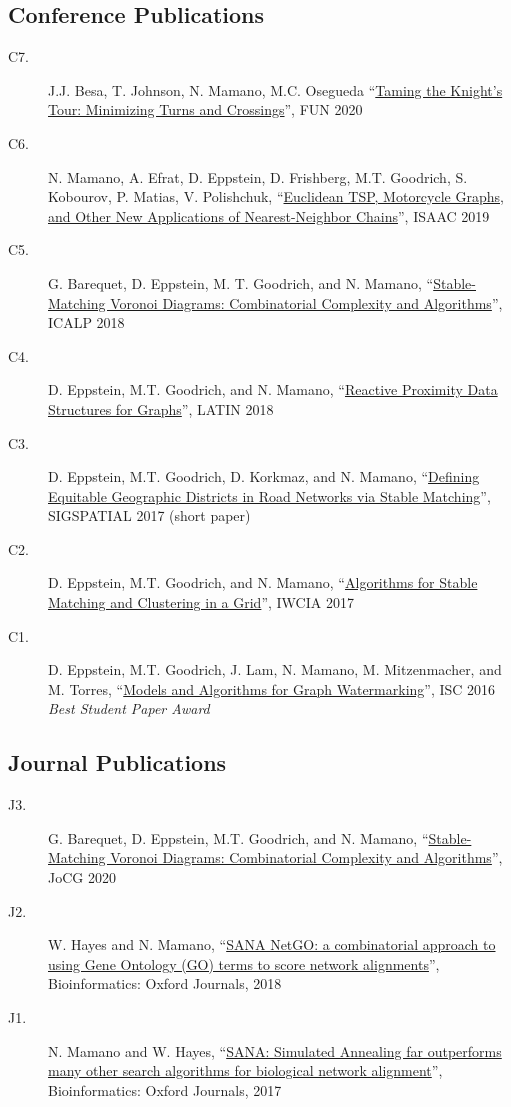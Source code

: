 \documentclass[letterpaper,10pt,oneside]{article}
\begin{document}
\subsection*{Conference Publications}
\begin{description}
\item[C7.] J.J. Besa, T. Johnson, N. Mamano, M.C. Osegueda ``\href{https://arxiv.org/pdf/1904.02824.pdf}{Taming the Knight’s Tour: Minimizing Turns and Crossings}'', FUN 2020	
\item[C6.] N. Mamano, A. Efrat, D. Eppstein, D. Frishberg, M.T. Goodrich, S. Kobourov, P. Matias, V. Polishchuk, ``\href{https://arxiv.org/pdf/1902.06875.pdf}{Euclidean TSP, Motorcycle Graphs, and Other New Applications of Nearest-Neighbor Chains}'', ISAAC 2019
\item[C5.] G. Barequet, D. Eppstein, M. T. Goodrich, and N. Mamano, ``\href{https://arxiv.org/pdf/1804.09411.pdf}{Stable-Matching Voronoi Diagrams: Combinatorial Complexity and Algorithms}'', ICALP 2018
\item[C4.] D. Eppstein, M.T. Goodrich, and N. Mamano, ``\href{https://arxiv.org/pdf/1803.04555.pdf}{Reactive Proximity Data Structures for Graphs}'', LATIN 2018
\item[C3.] D. Eppstein, M.T. Goodrich, D. Korkmaz, and N. Mamano, ``\href{https://arxiv.org/pdf/1706.09593.pdf}{Defining Equitable Geographic Districts in Road Networks via Stable Matching}'', SIGSPATIAL 2017 (short paper)
\item[C2.] D. Eppstein, M.T. Goodrich, and N. Mamano, ``\href{https://arxiv.org/pdf/1704.02303.pdf}{Algorithms for Stable Matching and Clustering in a Grid}'', IWCIA 2017
\item[C1.] D. Eppstein, M.T. Goodrich, J. Lam, N. Mamano, M. Mitzenmacher, and M. Torres, ``\href{https://arxiv.org/pdf/1605.09425.pdf}{Models and Algorithms for Graph Watermarking}'', ISC 2016 \textit{Best Student Paper Award}
\end{description}
\subsection*{Journal Publications}
\begin{description}
\item[J3.] G. Barequet, D. Eppstein, M.T. Goodrich, and N. Mamano, ``\href{https://arxiv.org/pdf/1804.09411.pdf}{Stable-Matching Voronoi Diagrams: Combinatorial Complexity and Algorithms}'', JoCG 2020
\item[J2.] W. Hayes and N. Mamano, ``\href{https://academic.oup.com/bioinformatics/article/34/8/1345/4708230}{SANA NetGO: a combinatorial approach to using Gene Ontology (GO) terms to score network alignments}'', Bioinformatics: Oxford Journals, 2018
\item[J1.] N. Mamano and W. Hayes, ``\href{https://academic.oup.com/bioinformatics/article/33/14/2156/2996219}{SANA: Simulated Annealing far outperforms many other search algorithms for biological network alignment}'', Bioinformatics: Oxford Journals, 2017
\end{description}
\end{document}
